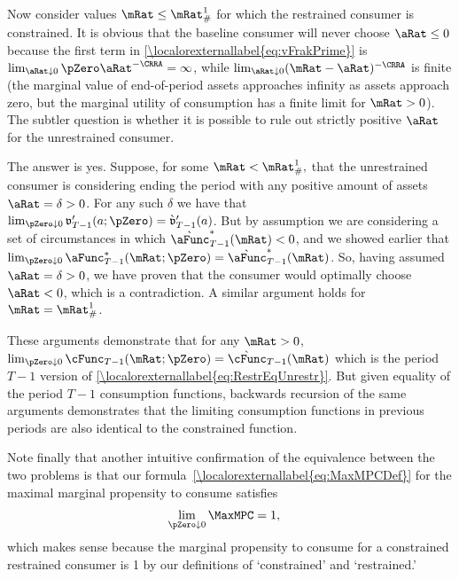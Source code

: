 \documentclass[\econtexRoot/BufferStockTheory.tex]{subfiles}
\begin{document}
Now consider values $\mRat\leq \mRat^{1}_{\#}$ for which the restrained consumer
is constrained.  It is obvious that the baseline consumer will never
choose $\aRat \leq 0$ because the first term in \eqref{\localorexternallabel{eq:vFrakPrime}} is $\lim_{\aRat \downarrow 0} \pZero  \aRat^{-\CRRA} =
\infty$, while $\lim_{\aRat \downarrow 0} (\mRat-\aRat)^{-\CRRA}$ is finite (the
marginal value of end-of-period assets approaches infinity as assets approach
zero, but the marginal utility of consumption has a finite limit for $\mRat>0$).
The subtler question is whether it is possible to rule out strictly positive
$\aRat$ for the unrestrained consumer.

The answer is yes.  Suppose, for some $\mRat < \mRat^{1}_{\#},$ that the
unrestrained consumer is considering ending the period with any
positive amount of assets $\aRat=\delta > 0$.  For any such $\delta$ we
have that $\lim_{\pZero  \downarrow 0} \mathfrak{v}_{T-1}^{\prime}(a;\pZero)=\grave{\mathfrak{v}}_{T-1}^{\prime}(a)$.
But by assumption we are considering a set of circumstances in which
$\grave{\aFunc}_{T-1}^{*}(\mRat) < 0$, and we showed earlier that
$\lim_{\pZero  \downarrow 0} \aFunc_{T-1}^{*}(\mRat;\pZero) = \grave{\aFunc}_{T-1}^{*}(\mRat)$.  So,
having assumed $\aRat = \delta > 0$, we have proven that the consumer
would optimally choose $\aRat < 0$, which is a contradiction.  A similar
argument holds for $\mRat = \mRat^{1}_{\#}$.

These arguments demonstrate that for any $\mRat>0$, $\lim_{\pZero
  \downarrow 0} \cFunc_{T-1}(\mRat;\pZero) =
\grave{\cFunc}_{T-1}(\mRat)$ which is the period $T-1$ version of
\eqref{\localorexternallabel{eq:RestrEqUnrestr}}.  But given equality of the period $T-1$
consumption functions, backwards recursion of the same arguments
demonstrates that the limiting consumption functions in previous
periods are also identical to the constrained function.

Note finally that another intuitive confirmation of the equivalence
between the two problems is that our formula~\eqref{\localorexternallabel{eq:MaxMPCDef}} for the maximal marginal
propensity to consume satisfies
\begin{eqnarray*}
  \lim_{\pZero \downarrow 0} \MaxMPC  & = 1,
\end{eqnarray*}
which makes sense because the marginal propensity to consume for a
constrained restrained consumer is 1 by our definitions of
`constrained' and `restrained.'

\onlyinsubfile{}
\end{document}
